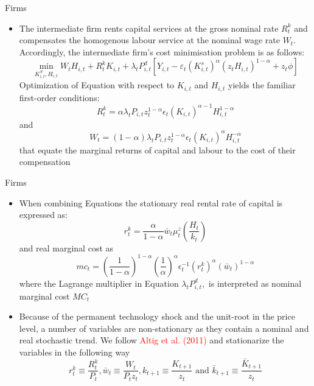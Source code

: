 \documentclass[9pt]{beamer}
\let\olditem\item
\renewcommand{\item}{%
\olditem\vspace{\fill}}
\begin{document}
\begin{frame}{Firms}
\begin{itemize}
    \item The intermediate firm rents capital services at the gross nominal rate $R_{t}^{k}$ and compensates the homogenous labour service at the nominal wage rate $W_{t} .$ Accordingly, the intermediate firm's cost minimisation problem is as follows:
$$
    \min _{K_{i, t}^{S}, H_{i, t}} W_{t} H_{i, t}+R_{t}^{k} K_{i, t}+\lambda_{t} P_{i, t}^{d}\left[Y_{i, t}-\varepsilon_{t}\left(K_{i, t}^{s}\right)^{\alpha}\left(z_{t} H_{i, t}\right)^{1-\alpha}+z_{t} \phi\right]
$$
Optimization of Equation with respect to $K_{i, t}$ and $H_{i, t}$ yields the familiar first-order conditions:
$$
    R_{t}^{k}=\alpha \lambda_{t} P_{i, t} z_{t}^{1-\alpha} \epsilon_{t}\left(K_{i, t}\right)^{\alpha-1} H_{i, t}^{1-\alpha}
$$
and
$$
    W_{t}=(1-\alpha) \lambda_{t} P_{i, t} z_{t}^{1-\alpha} \epsilon_{t}\left(K_{i, t}\right)^{\alpha} H_{i, t}^{-\alpha}
$$
that equate the marginal returns of capital and labour to the cost of their compensation
    
    
    
    
\end{itemize}


\end{frame}
\begin{frame}{Firms}
\begin{itemize}
    \item When combining Equations  the stationary real rental rate of capital is expressed as:
$$
r_{t}^{k}=\frac{\alpha}{1-\alpha} \bar{w}_{t} \mu_{t}^{z}\left(\frac{H_{t}}{k_{t}}\right)
$$
and real marginal cost as
$$
m c_{t}=\left(\frac{1}{1-\alpha}\right)^{1-\alpha}\left(\frac{1}{\alpha}\right)^{\alpha} \epsilon_{t}^{-1}\left(r_{t}^{k}\right)^{\alpha}\left(\bar{w}_{t}\right)^{1-\alpha}
$$
where the Lagrange multiplier in Equation $\lambda_{t} P_{i, t}^{d},$ is interpreted as nominal marginal cost $M C_{t}$
    
\item Because of the permanent technology shock and the unit-root in the price level, a number of variables are non-stationary as they contain a nominal and real stochastic trend. We follow \textcolor{red}{Altig et al. (2011)} and stationarize the variables in the following way
$$
    r_{t}^{k} \equiv \frac{R_{t}^{k}}{P_{t}}, \bar{w}_{t} \equiv \frac{W_{t}}{P_{t} z_{t}}, k_{t+1} \equiv \frac{K_{t+1}}{z_{t}} \text { and } \bar{k}_{t+1} \equiv \frac{\bar{K}_{t+1}}{z_{t}}
$$    
    
    
\end{itemize}


\end{frame}
\end{document}
